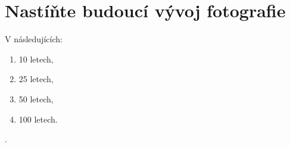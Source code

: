 \section{Nastíňte budoucí vývoj fotografie}
V následujících:
\begin{enumerate}
    \item 10 letech,
    \item 25 letech,
    \item 50 letech,
    \item 100 letech.
\end{enumerate}.